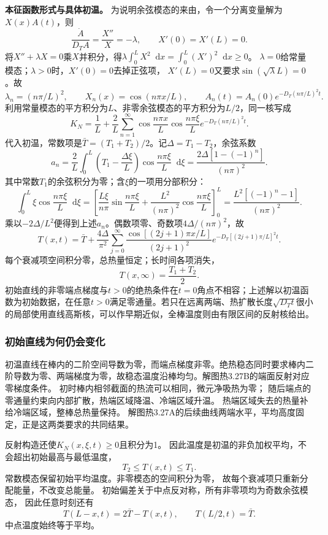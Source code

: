 \documentclass[UTF8,fontset=fandol,a4paper,11pt]{ctexart}
\newcommand{\dd}{\mathop{}\!\mathrm{d}}
\newcommand{\result}[1]{\begin{equation*}\boxed{#1}\end{equation*}}
\begin{document}
\textbf{本征函数形式与具体初温。} 为说明余弦模态的来由，令一个分离变量解为$X(x)A(t)$，则
\[
\frac{\dot A}{D_TA}=\frac{X''}{X}=-\lambda,\qquad
X'(0)=X'(L)=0.
\]
将$X''+\lambda X=0$乘$X$并积分，得$\lambda\int_0^L X^2\dd x=\int_0^L(X')^2\dd x\ge0$。
$\lambda=0$给常量模态；$\lambda>0$时，$X'(0)=0$去掉正弦项，
$X'(L)=0$又要求$\sin(\sqrt\lambda L)=0$。故
\[
\lambda_n=(n\pi/L)^2,\qquad X_n(x)=\cos(n\pi x/L),\qquad
A_n(t)=A_n(0)e^{-D_T(n\pi/L)^2t}.
\]
利用常量模态的平方积分为$L$、非零余弦模态的平方积分为$L/2$，同一核写成
\[K_N=\frac1L+\frac2L\sum_{n=1}^{\infty}
\cos\frac{n\pi x}{L}\cos\frac{n\pi\xi}{L}e^{-D_T(n\pi/L)^2t}.\]
代入初温，常数项是$\bar T=(T_1+T_2)/2$。记$\Delta=T_1-T_2$，余弦系数
\[a_n=\frac2L\int_0^L\left(T_1-\frac{\Delta\xi}L\right)
\cos\frac{n\pi\xi}L\dd\xi
=\frac{2\Delta[1-(-1)^n]}{(n\pi)^2}.\]
其中常数$T_1$的余弦积分为零；含$\xi$的一项用分部积分：
\[
\int_0^L\xi\cos\frac{n\pi\xi}{L}\dd\xi
=\left[\frac{L\xi}{n\pi}\sin\frac{n\pi\xi}{L}
+\frac{L^2}{(n\pi)^2}\cos\frac{n\pi\xi}{L}\right]_0^L
=\frac{L^2[(-1)^n-1]}{(n\pi)^2}.
\]
乘以$-2\Delta/L^2$便得到上述$a_n$。偶数项零、奇数项$4\Delta/(n\pi)^2$，故
\[T(x,t)=\bar T+\frac{4\Delta}{\pi^2}\sum_{j=0}^{\infty}
\frac{\cos[(2j+1)\pi x/L]}{(2j+1)^2}
 e^{-D_T[(2j+1)\pi/L]^2t}.\]
每个衰减项空间积分零，总热量恒定；长时间各项消失，
\result{T(x,\infty)=\frac{T_1+T_2}{2}.}
初始直线的非零端点梯度与$t>0$的绝热条件在$t=0$角点不相容；上述解以初温函数为初始数据，在任意$t>0$满足零通量。若只在远离两端、热扩散长度$\sqrt{D_Tt}$很小的局部使用直线高斯核，可以作早期近似，全棒温度则由有限区间的反射核给出。
\subsubsection*{初始直线为何仍会变化}
初温直线在棒内的二阶空间导数为零，而端点梯度非零。绝热稳态同时要求棒内二阶导数为零、两端梯度为零，故稳态温度沿棒均匀。解图热3.27B的端面反射对应零梯度条件。
初时棒内相邻截面的热流可以相同，微元净吸热为零；
随后端点的零通量约束向内部扩散，热端区域降温、冷端区域升温。
热端区域失去的热量补给冷端区域，整棒总热量保持。
解图热3.27A的后续曲线两端水平，平均高度固定，正是这两类要求的共同结果。

反射构造还使$K_N(x,\xi,t)\ge0$且积分为1。
因此温度是初温的非负加权平均，不会超出初始最高与最低温度，
\[
T_2\le T(x,t)\le T_1.
\]
常数模态保留初始平均温度。非零模态的空间积分为零，
故每个衰减项只重新分配能量，不改变总能量。
初始偏差关于中点反对称，所有非零项均为奇数余弦模态，
因此任意时刻还有
\[
T(L-x,t)=2\bar T-T(x,t),\qquad T(L/2,t)=\bar T.
\]
中点温度始终等于平均。
\end{document}

